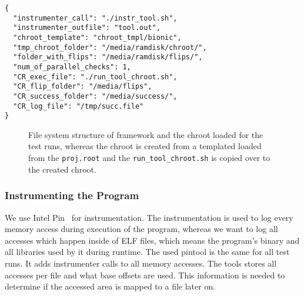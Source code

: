 \begin{minipage}{\linewidth}
\begin{lstlisting}[style=nasm,
                   caption={JSON style config file for the framework, showing
all parameters used to tweak each part of the framework. Entries
starting with \texttt{CR\_} are used inside the testing \texttt{chroot}.},
                   label={lst:expconfig}]
{
  "instrumenter_call": "./instr_tool.sh",
  "instrumenter_outfile": "tool.out",
  "chroot_template": "chroot_tmpl/bionic",
  "tmp_chroot_folder": "/media/ramdisk/chroot/",
  "folder_with_flips": "/media/ramdisk/flips/",
  "num_of_parallel_checks": 1,
  "CR_exec_file": "./run_tool_chroot.sh",
  "CR_flip_folder": "/media/flips",
  "CR_success_folder": "/media/success/",
  "CR_log_file": "/tmp/succ.file"
}
\end{lstlisting}
\end{minipage}

\begin{figure}
\caption{File system structure of framework and the chroot loaded for the test
runs, whereas the chroot is created from a templated loaded from the
\texttt{proj.root} and the \texttt{run\_tool\_chroot.sh} is copied over to the
created chroot.}
\label{fig:framfilesys}
\end{figure}

\subsubsection{Instrumenting the Program}

We use Intel Pin~\cite{pintool} for instrumentation. The instrumentation is used
to log every memory access during execution of the program, whereas we want to
log all accesses which happen inside of ELF files, which means the program's
binary and all libraries used by it during runtime. The used pintool is the same
for all test runs. It adds instrumenter calls to all memory accesses. The tools
stores all accesses per file and what base offsets are used. This information is
needed to determine if the accessed area is mapped to a file later on.


